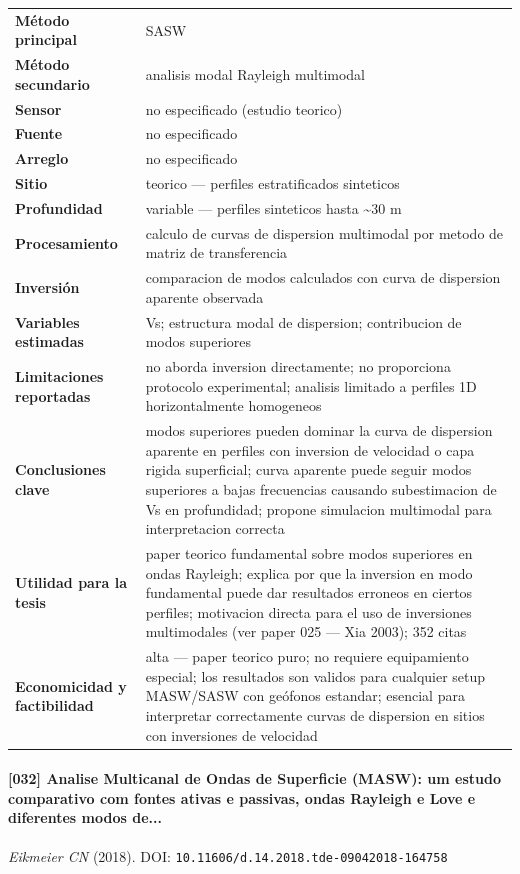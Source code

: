 \begin{center}\scriptsize
\begin{tabularx}{\textwidth}{@{}>{\bfseries}p{3.3cm} X@{}}
\toprule
M\'etodo principal & SASW \\
M\'etodo secundario & analisis modal Rayleigh multimodal \\
Sensor & no especificado (estudio teorico) \\
Fuente & no especificado \\
Arreglo & no especificado \\
Sitio & teorico --- perfiles estratificados sinteticos \\
Profundidad & variable --- perfiles sinteticos hasta \textasciitilde{}30 m \\
Procesamiento & calculo de curvas de dispersion multimodal por metodo de matriz de transferencia \\
Inversi\'on & comparacion de modos calculados con curva de dispersion aparente observada \\
Variables estimadas & Vs; estructura modal de dispersion; contribucion de modos superiores \\
Limitaciones reportadas & no aborda inversion directamente; no proporciona protocolo experimental; analisis limitado a perfiles 1D horizontalmente homogeneos \\
Conclusiones clave & modos superiores pueden dominar la curva de dispersion aparente en perfiles con inversion de velocidad o capa rigida superficial; curva aparente puede seguir modos superiores a bajas frecuencias causando subestimacion de Vs en profundidad; propone simulacion multimodal para interpretacion correcta \\
Utilidad para la tesis & paper teorico fundamental sobre modos superiores en ondas Rayleigh; explica por que la inversion en modo fundamental puede dar resultados erroneos en ciertos perfiles; motivacion directa para el uso de inversiones multimodales (ver paper 025 --- Xia 2003); 352 citas \\
Economicidad y factibilidad & alta --- paper teorico puro; no requiere equipamiento especial; los resultados son validos para cualquier setup MASW/SASW con geófonos estandar; esencial para interpretar correctamente curvas de dispersion en sitios con inversiones de velocidad \\
\bottomrule
\end{tabularx}
\end{center}

\paragraph{[032] Analise Multicanal de Ondas de Superficie (MASW): um estudo comparativo com fontes ativas e passivas, ondas Rayleigh e Love e diferentes modos de...} \emph{Eikmeier CN} (2018).
{\scriptsize DOI: \texttt{10.11606/d.14.2018.tde-09042018-164758}}

